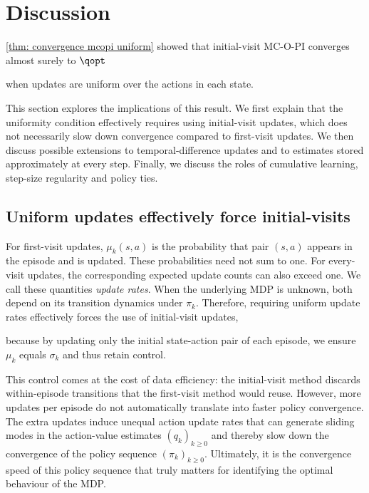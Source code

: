 
\section{Discussion}
\label{sec: discussion}

\autoref{thm: convergence mcopi uniform} showed that initial-visit MC-O-PI converges almost surely to $\qopt$ 

when updates are uniform over the actions in each state.








This section explores the implications of this result.
We first explain that the uniformity condition effectively requires using initial-visit updates, which does not necessarily slow down convergence compared to first-visit updates.
We then discuss possible extensions to temporal-difference updates and to estimates stored approximately at every step.
Finally, we discuss the roles of cumulative learning, step-size regularity and policy ties.








\subsection{Uniform updates effectively force initial-visits}


For first-visit updates, $\mu_k(s,a)$ is the probability that pair $(s,a)$ appears in the episode and is updated. These probabilities need not sum to one. For every-visit updates, the corresponding expected update counts can also exceed one. We call these quantities \emph{update rates}. When the underlying MDP is unknown, both depend on its transition dynamics under $\pi_k$.
Therefore, requiring uniform update rates effectively forces the use of initial-visit updates,

because by updating only the initial state-action pair of each episode, we ensure $\mu_k$ equals $\sigma_k$ and thus retain control.

This control comes at the cost of data efficiency: the initial-visit method discards within-episode transitions that the first-visit method would reuse. However, more updates per episode do not automatically translate into faster policy convergence.
The extra updates induce unequal action update rates that can generate sliding modes in the action-value estimates $(q_k)_{k \ge 0}$ and thereby slow down the convergence of the policy sequence $(\pi_k)_{k \ge 0}$. Ultimately, it is the convergence speed of this policy sequence that truly matters for identifying the optimal behaviour of the MDP.


